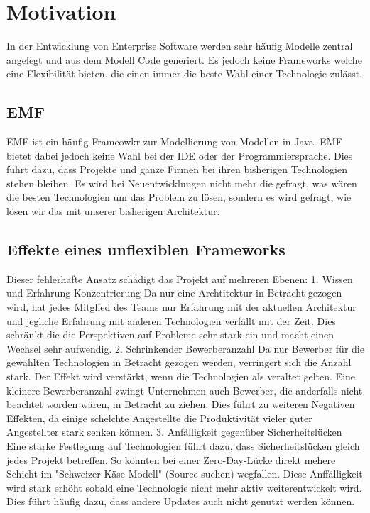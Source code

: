 \documentclass{article}
\begin{document}
\section{Motivation}
In der Entwicklung von Enterprise Software werden sehr häufig Modelle zentral angelegt und aus dem Modell Code generiert. 
Es jedoch keine Frameworks welche eine Flexibilität bieten, die einen immer die beste Wahl einer Technologie zulässt.
\subsection{EMF}
EMF ist ein häufig Frameowkr zur Modellierung von Modellen in Java. EMF bietet dabei jedoch keine Wahl bei der IDE oder der Programmiersprache.
Dies führt dazu, dass Projekte und ganze Firmen bei ihren bisherigen Technologien stehen bleiben. Es wird bei Neuentwicklungen nicht mehr die gefragt, was wären die besten Technologien um das Problem zu lösen, sondern es wird gefragt, wie lösen wir das mit unserer bisherigen Architektur. 
\subsection{Effekte eines unflexiblen Frameworks}
Dieser fehlerhafte Ansatz schädigt das Projekt auf mehreren Ebenen:
1. Wissen und Erfahrung Konzentrierung
Da nur eine Archtitektur in Betracht gezogen wird, hat jedes Mitglied des Teams nur Erfahrung mit der aktuellen Architektur und jegliche Erfahrung mit anderen Technologien verfällt mit der Zeit. Dies schränkt die die Perspektiven auf Probleme sehr stark ein und macht einen Wechsel sehr aufwendig.
2. Schrinkender Bewerberanzahl
Da nur Bewerber für die gewählten Technologien in Betracht gezogen werden, verringert sich die Anzahl stark. Der Effekt wird verstärkt, wenn die Technologien als veraltet gelten. Eine kleinere Bewerberanzahl zwingt Unternehmen auch Bewerber, die anderfalls nicht beachtet worden wären, in Betracht zu ziehen. Dies führt zu weiteren Negativen Effekten, da einige schelchte Angestellte die Produktivität vieler guter Angestellter stark senken können.
3. Anfälligkeit gegenüber Sicherheitslücken
Eine starke Festlegung auf Technologien führt dazu, dass Sicherheitslücken gleich jedes Projekt betreffen. So könnten bei einer Zero-Day-Lücke direkt mehere Schicht im "Schweizer Käse Modell" (Source suchen)  wegfallen.
Diese Anffälligkeit wird stark erhöht sobald eine Technologie nicht mehr aktiv weiterentwickelt wird. Dies führt häufig dazu, dass andere Updates auch nicht genutzt werden können.
\end{document}
